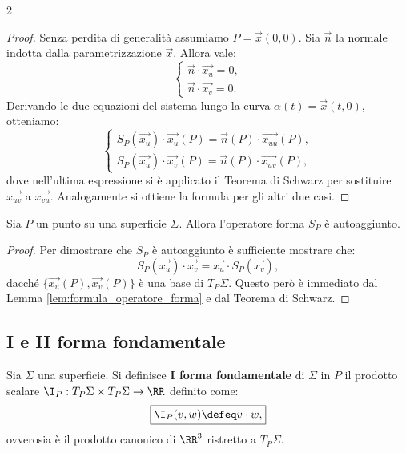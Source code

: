 \begin{multicols*}{2}
    \begin{proof}
        Senza perdita di generalità assumiamo $P = \vec{x}(0, 0)$.
        Sia $\vec{n}$ la normale indotta dalla parametrizzazione $\vec{x}$. Allora vale:
        \[
            \begin{cases}
                \vec{n} \cdot \vec{x_u} = 0, \\
                \vec{n} \cdot \vec{x_v} = 0.
            \end{cases}
        \]
        Derivando le due equazioni del sistema lungo la curva $\alpha(t) = \vec{x}(t, 0)$,
        otteniamo:
        \[
            \begin{cases}
                S_P(\vec{x_u}) \cdot \vec{x_u}(P) = \vec{n}(P) \cdot \vec{x_{uu}}(P), \\
                S_P(\vec{x_u}) \cdot \vec{x_v}(P) = \vec{n}(P) \cdot \vec{x_{uv}}(P),
            \end{cases}
        \]
        dove nell'ultima espressione si è applicato il Teorema di Schwarz per sostituire $\vec{x_{uv}}$
        a $\vec{x_{vu}}$. Analogamente si ottiene la formula per gli altri due casi.
    \end{proof}

    \begin{proposition} \label{prop:forma_autoaggiunta}
        Sia $P$ un punto su una superficie $\Sigma$. Allora l'operatore
        forma $S_P$ è autoaggiunto.
    \end{proposition}

    \begin{proof}
        Per dimostrare che $S_P$ è autoaggiunto è sufficiente mostrare
        che:
        \[ S_P(\vec{x_u}) \cdot \vec{x_v} = \vec{x_u} \cdot S_P(\vec{x_v}), \]
        dacché $\{\vec{x_u}(P), \vec{x_v}(P)\}$ è una base di $T_P \Sigma$. Questo
        però è immediato dal Lemma \ref{lem:formula_operatore_forma} e dal Teorema
        di Schwarz.
    \end{proof}

    \subsection{I e II forma fondamentale}

    \begin{definition}
        Sia $\Sigma$ una superficie. Si definisce \textbf{I forma fondamentale}
        di $\Sigma$ in $P$ il prodotto scalare $\I_P : T_P \Sigma \times T_P \Sigma \to \RR$
        definito come:
        \[
            \boxed{\I_P(v, w) \defeq v \cdot w,}
        \]
        ovverosia è il prodotto canonico di $\RR^3$ ristretto
        a $T_P \Sigma$.
    \end{definition}


\end{multicols*}
